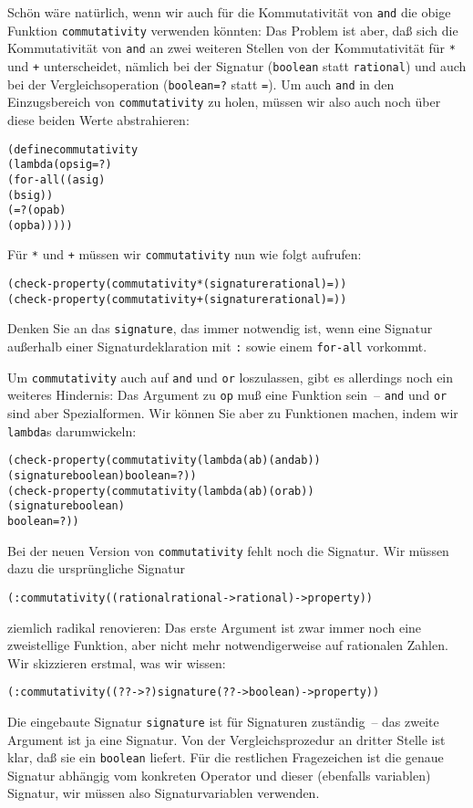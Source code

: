Schön wäre natürlich, wenn wir auch für die Kommutativität von
\texttt{and} die obige Funktion \texttt{commutativity} verwenden
könnten: Das Problem ist aber, daß sich die Kommutativität von
\texttt{and} an zwei weiteren Stellen von der Kommutativität für
\texttt{*} und \texttt{+} unterscheidet, nämlich bei der Signatur
(\texttt{boolean} statt \texttt{rational}) und auch bei der
Vergleichsoperation (\texttt{boolean=?} statt \texttt{=}).  Um auch
\texttt{and} in den Einzugsbereich von \texttt{commutativity} zu
holen, müssen wir also auch noch über diese beiden Werte abstrahieren:
%
\begin{alltt}
(define commutativity
  (lambda (op sig =?)
    (for-all ((a sig)
              (b sig))
      (=? (op a b)
          (op b a)))))
\end{alltt}
%
Für \texttt{*} und \texttt{+} müssen wir \texttt{commutativity} nun
wie folgt aufrufen:
%
\begin{alltt}
(check-property (commutativity * (signature rational) =))
(check-property (commutativity + (signature rational) =))
\end{alltt}
%
Denken Sie an das \texttt{signature}, das immer notwendig ist, wenn
eine Signatur außerhalb einer Signaturdeklaration mit \texttt{:} sowie
einem \texttt{for-all} vorkommt.

Um \texttt{commutativity} auch auf \texttt{and} und \texttt{or}
loszulassen, gibt es allerdings noch ein weiteres Hindernis: Das
Argument zu \texttt{op} muß eine Funktion sein~-- \texttt{and} und
\texttt{or} sind aber Spezialformen.  Wir können Sie aber zu
Funktionen machen, indem wir \texttt{lambda}s darumwickeln:
%
\begin{alltt}
(check-property (commutativity (lambda (a b) (and a b))
                               (signature boolean) boolean=?))
(check-property (commutativity (lambda (a b) (or a b))
                               (signature boolean)
                               boolean=?))
\end{alltt}
%
Bei der neuen Version von \texttt{commutativity} fehlt noch die
Signatur.  Wir müssen dazu die ursprüngliche Signatur
%
\begin{alltt}
(: commutativity ((rational rational -> rational) -> property))
\end{alltt}
%
ziemlich radikal renovieren: Das erste Argument ist zwar immer noch
eine zweistellige Funktion, aber nicht mehr notwendigerweise auf
rationalen Zahlen.  Wir skizzieren erstmal, was wir wissen:
%
\begin{alltt}
(: commutativity ((? ? -> ?) signature (? ? -> boolean) -> property))
\end{alltt}
%
Die eingebaute Signatur \texttt{signature} ist für Signaturen
zuständig~-- das zweite Argument ist ja eine Signatur.  Von der
Vergleichsprozedur an dritter Stelle ist klar, daß sie ein
\texttt{boolean} liefert.  Für die restlichen Fragezeichen ist die
genaue Signatur abhängig vom konkreten Operator und dieser (ebenfalls
variablen) Signatur, wir müssen also Signaturvariablen verwenden.


